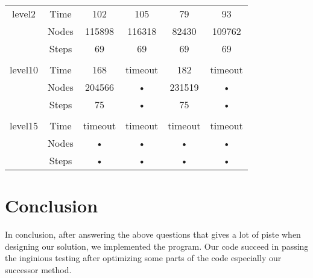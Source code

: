 \documentclass[10pt,a4paper]{article}
\begin{document}
\begin{enumerate}
\begin{table}
\begin{tabular}{|c|c|c|c|c|c|}
	  \hline 
	 &  &  &  &  & \\ 
	\hline 
	level2 & Time & 102 & 105 & 79 & 93 \\ 
	\hline 
	 & Nodes & 115898 & 116318 & 82430 & 109762 \\ 
	\hline 
	 & Steps & 69 & 69 & 69 & 69 \\ 
	  \hline 
	 &  &  &  &  & \\ 
	\hline 
	level10 & Time & 168 & timeout & 182 & timeout \\ 
	\hline 
	 & Nodes & 204566 & • & 231519 & • \\ 
	\hline 
	 & Steps & 75 & • & 75 & • \\
	  \hline 
	 &  &  &  &  & \\  
	\hline 
	level15 & Time & timeout & timeout & timeout & timeout \\ 
	\hline 
	 & Nodes & • & • & • & • \\ 
	\hline 
	 & Steps & • & • & • & • \\ 
	\hline 
	\end{tabular} 
\end{table}

\end{enumerate}

\section*{Conclusion}

In conclusion, after answering the above questions that gives a lot of piste when designing our solution, we implemented the program. Our code succeed in passing the inginious testing after optimizing some parts of the code especially our successor method.
\end{document}
